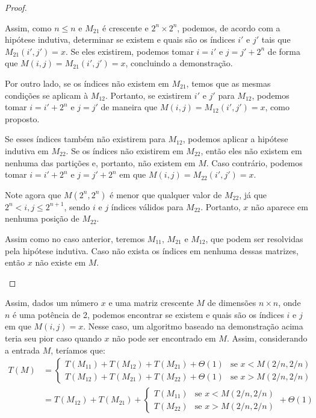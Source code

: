 \begin{proof}
\begin{case}
        Assim, como $n \leq n$ e $M_{21}$ é crescente e $2^n \times 2^n$, podemos, de acordo com a hipótese indutiva, determinar se existem e quais são os índices $i'$ e $j'$ tais que $M_{21}(i', j') = x$. Se eles existirem, podemos tomar $i = i'$ e $j = j' + 2^n$ de forma que $M(i, j) = M_{21}(i', j') = x$, concluindo a demonstração.

        Por outro lado, se os índices não existem em $M_{21}$, temos que as mesmas condições se aplicam à $M_{12}$. Portanto, se existirem $i'$ e $j'$ para $M_{12}$, podemos tomar $i = i' + 2^n$ e $j = j'$ de maneira que $M(i, j) = M_{12}(i', j') = x$, como proposto.

        Se esses índices também não existirem para $M_{12}$, podemos aplicar a hipótese indutiva em $M_{22}$. Se os índices não existirem em $M_{22}$, então eles não existem em nenhuma das partições e, portanto, não existem em $M$. Caso contrário, podemos tomar $i = i' + 2^n$ e $j = j' + 2^n$ em que $M(i,j) = M_{22}(i', j') = x$.
    \end{case}
    \begin{case}
        Note agora que $M\left(2^n, 2^n\right)$ é menor que qualquer valor de $M_{22}$, já que $2^n < i, j \leq 2^{n+1}$, sendo $i$ e $j$ índices válidos para $M_{22}$. Portanto, $x$ não aparece em nenhuma posição de $M_{22}$.

        Assim como no caso anterior, teremos $M_{11}$, $M_{21}$ e $M_{12}$, que podem ser resolvidas pela hipótese indutiva. Caso não exista os índices em nenhuma dessas matrizes, então $x$ não existe em $M$.
    \end{case}
\end{proof}

\itemsep

Assim, dados um número $x$ e uma matriz crescente $M$ de dimensões $n \times n$, onde $n$ é uma potência de 2, podemos encontrar se existem e quais são os índices $i$ e $j$ em que $M(i,j) = x$. Nesse caso, um algoritmo baseado na demonstração acima teria seu pior caso quando $x$ não pode ser encontrado em $M$. Assim, considerando a entrada $M$, teríamos que:
\begin{align*}
    T(M) &= \begin{cases}
        T(M_{11}) + T(M_{12}) + T(M_{21}) + \Theta(1) & \text{se $x < M(2/n, 2/n)$} \\
        T(M_{12}) + T(M_{21}) + T(M_{22}) + \Theta(1) & \text{se $x > M(2/n, 2/n)$}
    \end{cases} \\
    &= T(M_{12}) + T(M_{21}) + \begin{cases}
        T(M_{11}) & \text{se $x < M(2/n, 2/n)$} \\
        T(M_{22}) & \text{se $x > M(2/n, 2/n)$}
    \end{cases} + \Theta(1)
\end{align*}


